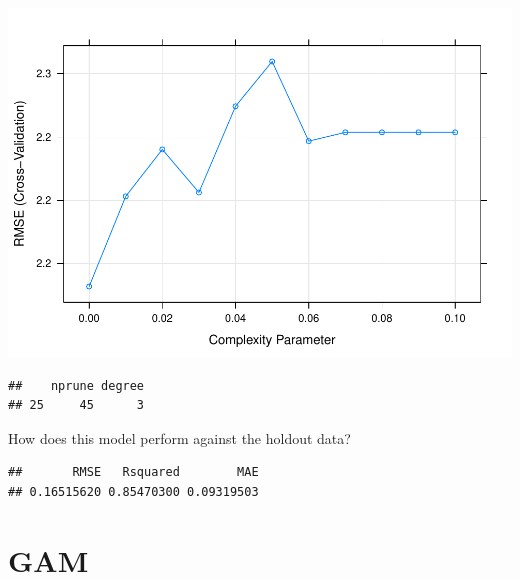 \documentclass[
]{book}
\newenvironment{Shaded}{\begin{snugshade}}{\end{snugshade}}
\newcommand{\DataTypeTok}[1]{\textcolor[rgb]{0.13,0.29,0.53}{#1}}
\newcommand{\KeywordTok}[1]{\textcolor[rgb]{0.13,0.29,0.53}{\textbf{#1}}}
\newcommand{\NormalTok}[1]{#1}
\newcommand{\OperatorTok}[1]{\textcolor[rgb]{0.81,0.36,0.00}{\textbf{#1}}}
\begin{document}
\includegraphics{data-sci_files/figure-latex/unnamed-chunk-94-1.pdf}

\begin{Shaded}
\end{Shaded}

\begin{verbatim}
##    nprune degree
## 25     45      3
\end{verbatim}

How does this model perform against the holdout data?

\begin{Shaded}
\end{Shaded}

\begin{verbatim}
##       RMSE   Rsquared        MAE 
## 0.16515620 0.85470300 0.09319503
\end{verbatim}

\hypertarget{gam}{%
\section{GAM}\label{gam}}
\end{document}
